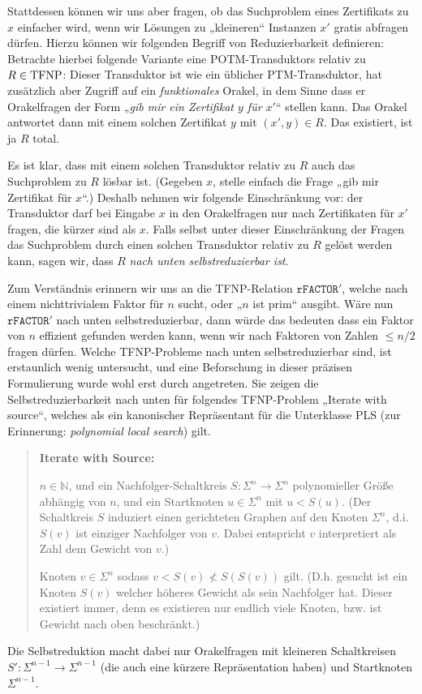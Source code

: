 Stattdessen können wir uns aber fragen, ob das Suchproblem eines Zertifikats zu $x$ einfacher wird, wenn wir Lösungen zu „kleineren“ Instanzen $x'$ gratis abfragen dürfen.
Hierzu können wir folgenden Begriff von Reduzierbarkeit definieren:
Betrachte hierbei folgende Variante eine POTM-Transduktors relativ zu $R\in\mathrm{TFNP}$: Dieser Transduktor ist wie ein üblicher PTM-Transduktor, hat zusätzlich aber Zugriff auf ein \emph{funktionales} Orakel, in dem Sinne dass er Orakelfragen der Form „\emph{gib mir ein Zertifikat $y$ für $x'$}“ stellen kann. Das Orakel antwortet dann mit einem solchen Zertifikat $y$ mit $(x', y)\in R$. Das existiert, ist ja $R$ total. 

Es ist klar, dass mit einem solchen Transduktor relativ zu $R$ auch das Suchproblem zu $R$ lösbar ist. (Gegeben $x$, stelle einfach die Frage „gib mir Zertifikat für $x$“.) Deshalb nehmen wir folgende Einschränkung vor: der Transduktor darf bei Eingabe $x$ in den Orakelfragen nur nach Zertifikaten für $x'$ fragen, die kürzer sind als $x$.
Falls selbst unter dieser Einschränkung der Fragen das Suchproblem durch einen solchen Transduktor relativ zu $R$ gelöst werden kann, sagen wir, dass $R$ \emph{nach unten selbstreduzierbar ist}.

Zum Verständnis erinnern wir uns an die TFNP-Relation $\mathtt{rFACTOR}'$, welche nach einem nichttrivialem Faktor für $n$ sucht, oder „$n$ ist prim“ ausgibt. Wäre nun $\mathtt{rFACTOR}'$  nach unten selbstreduzierbar, dann würde das bedeuten dass ein Faktor von $n$ effizient gefunden werden kann, wenn wir nach Faktoren von Zahlen $\leq n/2$ fragen dürfen.
Welche TFNP-Probleme nach unten selbstreduzierbar sind, ist erstaunlich wenig untersucht, und eine Beforschung in dieser präzisen Formulierung wurde wohl erst durch \textcite{harsha_downward_2023} angetreten.
Sie zeigen die Selbstreduzierbarkeit nach unten für folgendes TFNP-Problem „Iterate with source“, welches als ein kanonischer Repräsentant für die Unterklasse $\mathrm{PLS}$ (zur Erinnerung: \emph{polynomial local search}) gilt.
\begin{quote}
    \textbf{Iterate with Source:}
    \begin{description}[nosep]
        \item[Gegeben:] $n\in\mathbb N$, und ein Nachfolger-Schaltkreis $S\colon\Sigma^n\to\Sigma^n$ polynomieller Größe abhängig von $n$, und ein Startknoten $u\in\Sigma^n$ mit $u<S(u)$. (Der Schaltkreis $S$ induziert einen gerichteten Graphen auf den Knoten $\Sigma^n$, d.i. $S(v)$ ist einziger Nachfolger von $v$. Dabei entspricht $v$ interpretiert als Zahl dem Gewicht von $v$.)
        \item[Gesucht:] Knoten $v\in\Sigma^n$ sodass $v<S(v)\not < S(S(v))$ gilt.
            (D.h. gesucht ist ein Knoten $S(v)$ welcher höheres Gewicht als sein Nachfolger hat. Dieser existiert immer, denn es existieren nur endlich viele Knoten, bzw. ist Gewicht nach oben beschränkt.)
    \end{description}
\end{quote}
Die Selbstreduktion macht dabei nur Orakelfragen mit kleineren Schaltkreisen $S'\colon\allowbreak\Sigma^{n-1}\to\Sigma^{n-1}$ (die auch eine kürzere Repräsentation haben) und Startknoten $\Sigma^{n-1}$.


